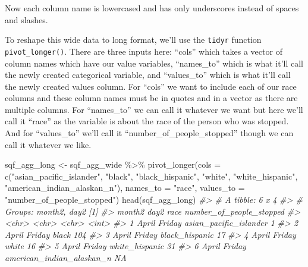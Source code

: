 \documentclass[
]{krantz}
\makeatletter
\newenvironment{Shaded}{\begin{snugshade}}{\end{snugshade}}
\newcommand{\AttributeTok}[1]{\textcolor[rgb]{0.61,0.61,0.61}{#1}}
\newcommand{\CommentTok}[1]{\textcolor[rgb]{0.37,0.37,0.37}{\textit{#1}}}
\newcommand{\FunctionTok}[1]{\textcolor[rgb]{0,0,0}{#1}}
\newcommand{\NormalTok}[1]{#1}
\newcommand{\OtherTok}[1]{\textcolor[rgb]{0.37,0.37,0.37}{#1}}
\newcommand{\SpecialCharTok}[1]{\textcolor[rgb]{0,0,0}{#1}}
\newcommand{\StringTok}[1]{\textcolor[rgb]{0.5,0.5,0.5}{#1}}
\newenvironment{kframe}{%
\medskip{}
\setlength{\fboxsep}{.8em}
 \def\at@end@of@kframe{}%
 \ifinner\ifhmode%
  \def\at@end@of@kframe{\end{minipage}}%
  \begin{minipage}{\columnwidth}%
 \fi\fi%
 \def\FrameCommand##1{\hskip\@totalleftmargin \hskip-\fboxsep
 \colorbox{shadecolor}{##1}\hskip-\fboxsep
     \hskip-\linewidth \hskip-\@totalleftmargin \hskip\columnwidth}%
 \MakeFramed {\advance\hsize-\width
   \@totalleftmargin\z@ \linewidth\hsize
   \@setminipage}}%
 {\par\unskip\endMakeFramed%
 \at@end@of@kframe}
\renewenvironment{Shaded}{\begin{kframe}}{\end{kframe}}
\makeatother
\begin{document}
Now each column name is lowercased and has only underscores instead of spaces and slashes.

To reshape this wide data to long format, we'll use the \texttt{tidyr} function \texttt{pivot\_longer()}. There are three inputs here: ``cols'' which takes a vector of column names which have our value variables, ``names\_to'' which is what it'll call the newly created categorical variable, and ``values\_to'' which is what it'll call the newly created values column. For ``cols'' we want to include each of our race columns and these column names must be in quotes and in a vector as there are multiple columns. For ``names\_to'' we can call it whatever we want but here we'll call it ``race'' as the variable is about the race of the person who was stopped. And for ``values\_to'' we'll call it ``number\_of\_people\_stopped'' though we can call it whatever we like.

\begin{Shaded}
\begin{Highlighting}[]
\NormalTok{sqf\_agg\_long }\OtherTok{\textless{}{-}}\NormalTok{ sqf\_agg\_wide }\SpecialCharTok{\%\textgreater{}\%}
  \FunctionTok{pivot\_longer}\NormalTok{(}\AttributeTok{cols =} \FunctionTok{c}\NormalTok{(}\StringTok{"asian\_pacific\_islander"}\NormalTok{, }
                        \StringTok{"black"}\NormalTok{,}
                        \StringTok{"black\_hispanic"}\NormalTok{,}
                        \StringTok{"white"}\NormalTok{,}
                        \StringTok{"white\_hispanic"}\NormalTok{,}
                        \StringTok{"american\_indian\_alaskan\_n"}\NormalTok{),}
               \AttributeTok{names\_to =} \StringTok{"race"}\NormalTok{,}
               \AttributeTok{values\_to =} \StringTok{"number\_of\_people\_stopped"}\NormalTok{)}
\FunctionTok{head}\NormalTok{(sqf\_agg\_long)}
\CommentTok{\#\textgreater{} \# A tibble: 6 x 4}
\CommentTok{\#\textgreater{} \# Groups:   month2, day2 [1]}
\CommentTok{\#\textgreater{}   month2 day2   race                      number\_of\_people\_stopped}
\CommentTok{\#\textgreater{}   \textless{}chr\textgreater{}  \textless{}chr\textgreater{}  \textless{}chr\textgreater{}                                        \textless{}int\textgreater{}}
\CommentTok{\#\textgreater{} 1 April  Friday asian\_pacific\_islander                           1}
\CommentTok{\#\textgreater{} 2 April  Friday black                                          104}
\CommentTok{\#\textgreater{} 3 April  Friday black\_hispanic                                  17}
\CommentTok{\#\textgreater{} 4 April  Friday white                                           16}
\CommentTok{\#\textgreater{} 5 April  Friday white\_hispanic                                  31}
\CommentTok{\#\textgreater{} 6 April  Friday american\_indian\_alaskan\_n                       NA}
\end{Highlighting}
\end{Shaded}
\end{document}

